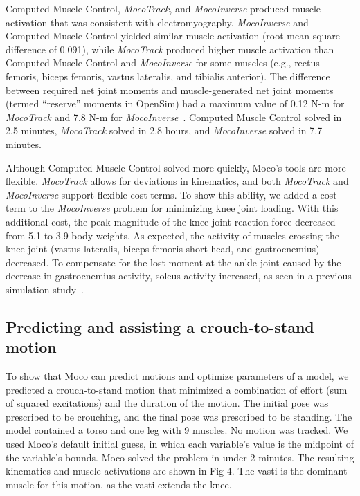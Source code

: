 \documentclass[10pt,letterpaper]{article}
\begin{document}
Computed Muscle Control, \textit{MocoTrack}, and \textit{MocoInverse} produced muscle activation that was consistent with electromyography. \textit{MocoInverse} and Computed Muscle Control yielded similar muscle activation (root-mean-square difference of 0.091), while \textit{MocoTrack} produced higher muscle activation than Computed Muscle Control and \textit{MocoInverse} for some muscles (e.g., rectus femoris, biceps femoris, vastus lateralis, and tibialis anterior). The difference between required net joint moments and muscle-generated net joint moments (termed “reserve” moments in OpenSim) had a maximum value of 0.12 N-m for \textit{MocoTrack} and 7.8 N-m for \textit{MocoInverse}~\cite{Hicks:2015bo}. Computed Muscle Control solved in 2.5 minutes, \textit{MocoTrack} solved in 2.8 hours, and \textit{MocoInverse} solved in 7.7 minutes.

Although Computed Muscle Control solved more quickly, Moco’s tools are more flexible. \textit{MocoTrack} allows for deviations in kinematics, and both \textit{MocoTrack} and \textit{MocoInverse} support flexible cost terms. To show this ability, we added a cost term to the \textit{MocoInverse} problem for minimizing knee joint loading. With this additional cost, the peak magnitude of the knee joint reaction force decreased from 5.1 to 3.9 body weights. As expected, the activity of muscles crossing the knee joint (vastus lateralis, biceps femoris short head, and gastrocnemius) decreased. To compensate for the lost moment at the ankle joint caused by the decrease in gastrocnemius activity, soleus activity increased, as seen in a previous simulation study~\cite{DeMers:2014}.

\subsection*{Predicting and assisting a crouch-to-stand motion}

To show that Moco can predict motions and optimize parameters of a model, we predicted a crouch-to-stand motion that minimized a combination of effort (sum of squared excitations) and the duration of the motion. The initial pose was prescribed to be crouching, and the final pose was prescribed to be standing. The model contained a torso and one leg with 9 muscles. No motion was tracked. We used Moco’s default initial guess, in which each variable’s value is the midpoint of the variable’s bounds. Moco solved the problem in under 2 minutes. The resulting kinematics and muscle activations are shown in Fig 4. The vasti is the dominant muscle for this motion, as the vasti extends the knee.
\end{document}
